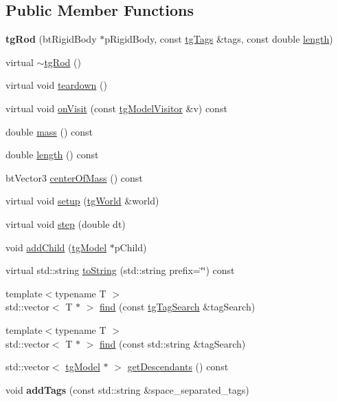 \subsection*{Public Member Functions}
\begin{DoxyCompactItemize}
\item 
\hypertarget{classtg_rod_a8b718cc38627d2ef66e135fae5a17c9e}{{\bfseries tg\-Rod} (bt\-Rigid\-Body $\ast$p\-Rigid\-Body, const \hyperlink{classtg_tags}{tg\-Tags} \&tags, const double \hyperlink{classtg_rod_af3c94065d43dcf54e5f325d61721e263}{length})}\label{classtg_rod_a8b718cc38627d2ef66e135fae5a17c9e}

\item 
virtual \hyperlink{classtg_rod_a233b6ac07df4074c985190d6491f8294}{$\sim$tg\-Rod} ()
\item 
virtual void \hyperlink{classtg_rod_a7a12ab9a8190c95c28c2dd6749bb1c8c}{teardown} ()
\item 
virtual void \hyperlink{classtg_rod_ae3651ef650b66a5d016bc5ffb27ec449}{on\-Visit} (const \hyperlink{classtg_model_visitor}{tg\-Model\-Visitor} \&v) const 
\item 
double \hyperlink{classtg_rod_ab1090c64d68829612fb74afbc55d0b63}{mass} () const 
\item 
double \hyperlink{classtg_rod_af3c94065d43dcf54e5f325d61721e263}{length} () const 
\item 
bt\-Vector3 \hyperlink{classtg_rod_aeb8f14739d3449ee0b344a18030dd474}{center\-Of\-Mass} () const 
\item 
virtual void \hyperlink{classtg_model_a85c68e064972f67c61c47ead392cf6f8}{setup} (\hyperlink{classtg_world}{tg\-World} \&world)
\item 
virtual void \hyperlink{classtg_model_acc6f9ae005f9f51447d7efe5f1815737}{step} (double dt)
\item 
void \hyperlink{classtg_model_a292c17848b96caee32b2286e44c13f2f}{add\-Child} (\hyperlink{classtg_model}{tg\-Model} $\ast$p\-Child)
\item 
virtual std\-::string \hyperlink{classtg_model_af37b0c1a6d4060bfe0bb9b5038a17725}{to\-String} (std\-::string prefix=\char`\"{}\char`\"{}) const 
\item 
{\footnotesize template$<$typename T $>$ }\\std\-::vector$<$ T $\ast$ $>$ \hyperlink{classtg_model_ab75836fdfbd9200f165c3b28a19630c0}{find} (const \hyperlink{classtg_tag_search}{tg\-Tag\-Search} \&tag\-Search)
\item 
{\footnotesize template$<$typename T $>$ }\\std\-::vector$<$ T $\ast$ $>$ \hyperlink{classtg_model_aa40b5fb32f8941e04d537f4e6c6db35c}{find} (const std\-::string \&tag\-Search)
\item 
std\-::vector$<$ \hyperlink{classtg_model}{tg\-Model} $\ast$ $>$ \hyperlink{classtg_model_a2efa4321fa5c77b4ce23b01f6fd3a1c4}{get\-Descendants} () const 
\item 
\hypertarget{classtg_taggable_af0b8f1729653b0b90d2fecbd51163612}{void {\bfseries add\-Tags} (const std\-::string \&space\-\_\-separated\-\_\-tags)}\label{classtg_taggable_af0b8f1729653b0b90d2fecbd51163612}


\end{DoxyCompactItemize}
